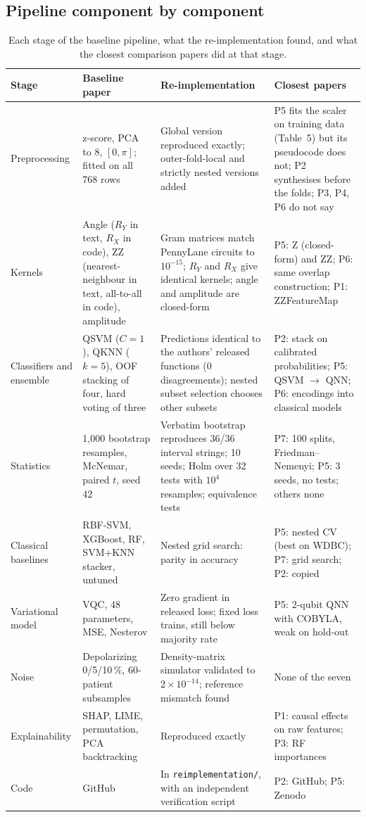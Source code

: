 \documentclass[11pt,a4paper]{article}
\newcommand{\code}[1]{\texttt{\small #1}}
\begin{document}
\subsection{Pipeline component by component}
\begin{table}[H]
\centering\scriptsize
\caption{Each stage of the baseline pipeline, what the re-implementation found, and what the closest comparison papers did at that stage.}
\label{tab:components}
\begin{tabularx}{\textwidth}{L{2.0cm} L{3.4cm} Y L{4.2cm}}
\toprule
Stage & Baseline paper & Re-implementation & Closest papers \\
\midrule
Preprocessing & z-score, PCA to 8, $[0,\pi]$; fitted on all 768 rows & Global version reproduced exactly; outer-fold-local and strictly nested versions added & P5 fits the scaler on training data (Table~5) but its pseudocode does not; P2 synthesises before the folds; P3, P4, P6 do not say \\
Kernels & Angle ($R_Y$ in text, $R_X$ in code), ZZ (nearest-neighbour in text, all-to-all in code), amplitude & Gram matrices match PennyLane circuits to $10^{-15}$; $R_Y$ and $R_X$ give identical kernels; angle and amplitude are closed-form & P5: Z (closed-form) and ZZ; P6: same overlap construction; P1: ZZFeatureMap \\
Classifiers and ensemble & QSVM ($C=1$), QKNN ($k=5$), OOF stacking of four, hard voting of three & Predictions identical to the authors' released functions (0 disagreements); nested subset selection chooses other subsets & P2: stack on calibrated probabilities; P5: QSVM $\to$ QNN; P6: encodings into classical models \\
Statistics & 1,000 bootstrap resamples, McNemar, paired $t$, seed 42 & Verbatim bootstrap reproduces 36/36 interval strings; 10 seeds; Holm over 32 tests with $10^4$ resamples; equivalence tests & P7: 100 splits, Friedman--Nemenyi; P5: 3 seeds, no tests; others none \\
Classical baselines & RBF-SVM, XGBoost, RF, SVM+KNN stacker, untuned & Nested grid search: parity in accuracy & P5: nested CV (best on WDBC); P7: grid search; P2: copied \\
Variational model & VQC, 48 parameters, MSE, Nesterov & Zero gradient in released loss; fixed loss trains, still below majority rate & P5: 2-qubit QNN with COBYLA, weak on hold-out \\
Noise & Depolarizing 0/5/10\,\%, 60-patient subsamples & Density-matrix simulator validated to $2\times10^{-14}$; reference mismatch found & None of the seven \\
Explainability & SHAP, LIME, permutation, PCA backtracking & Reproduced exactly & P1: causal effects on raw features; P3: RF importances \\
Code & GitHub & In \code{reimplementation/}, with an independent verification script & P2: GitHub; P5: Zenodo \\
\bottomrule
\end{tabularx}
\end{table}
\end{document}

